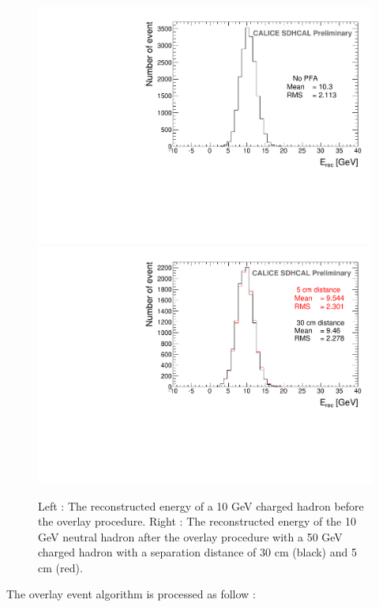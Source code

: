 \documentclass[cits]{JINST}
\begin{document}
\begin{figure}[!h]
  \begin{center}
    \includegraphics[width=0.48\linewidth]{plots/SingleParticle_10GeV.pdf}
    \includegraphics[width=0.48\linewidth]{plots/OverlayEvent_OverlayCompare.pdf}
  \end{center}
  \caption{\label{OVERLAY_EVENT_MC_EREC_OVERLAID_HITS} Left : The reconstructed energy of a 10 GeV charged hadron before the overlay procedure. Right : The reconstructed energy of the 10 GeV neutral hadron after the overlay procedure with a 50 GeV charged hadron with a separation distance of 30 cm (black) and 5 cm (red).}
\end{figure}

The overlay event algorithm is processed as follow :
\end{document}
